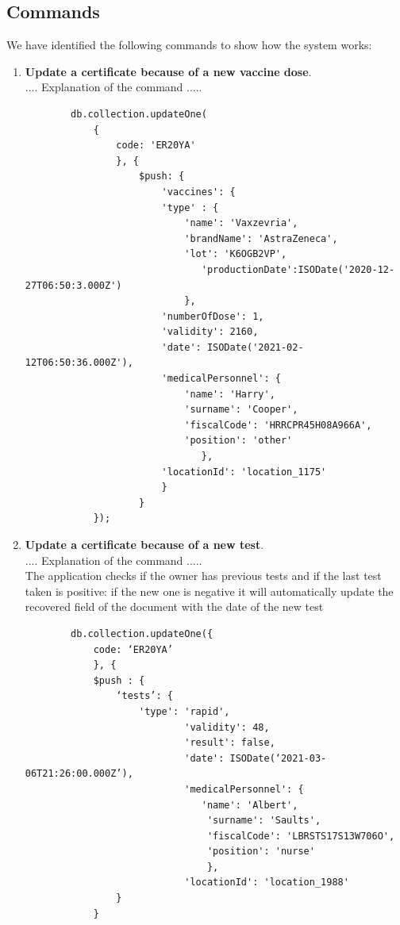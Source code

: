 \documentclass{article}
\begin{document}
\subsection{Commands}
We have identified the following commands to show how the system works:\\
\begin{enumerate}
    \item \textbf{Update a certificate because of a new vaccine dose}.\\ .... Explanation of the command .....
    \begin{lstlisting}
        db.collection.updateOne(
            {
                code: 'ER20YA'
                }, {
                    $push: {
                        'vaccines': {
                        'type' : {
                            'name': 'Vaxzevria',
                            'brandName': 'AstraZeneca',
                            'lot': 'K6OGB2VP',
                               'productionDate':ISODate('2020-12-27T06:50:3.000Z')
                            },
                        'numberOfDose': 1,
                        'validity': 2160,
                        'date': ISODate('2021-02-12T06:50:36.000Z'),
                        'medicalPersonnel': {
                            'name': 'Harry',
                            'surname': 'Cooper',
                            'fiscalCode': 'HRRCPR45H08A966A',
                            'position': 'other'
                               },
                        'locationId': 'location_1175'
                        }
                    }
            });
    \end{lstlisting}
    \item \textbf{Update a certificate because of a new test}.\\ .... Explanation of the command .....\\ The application checks if the owner has previous tests and if the last test taken is positive: if the new one is negative it will automatically update the recovered field of the document with the date of the new test
    \begin{lstlisting}
        db.collection.updateOne({
            code: ‘ER20YA’
            }, {
            $push : {
                ‘tests’: {
                    'type': 'rapid',
                            'validity': 48,
                            'result': false,
                            'date': ISODate(‘2021-03-06T21:26:00.000Z’),
                            'medicalPersonnel': {
                               'name': 'Albert',
                                'surname': 'Saults',
                                'fiscalCode': 'LBRSTS17S13W706O',
                                'position': 'nurse'
                                },
                            'locationId': 'location_1988'
                }
            }
        

\end{lstlisting}
\end{enumerate}
\end{document}
